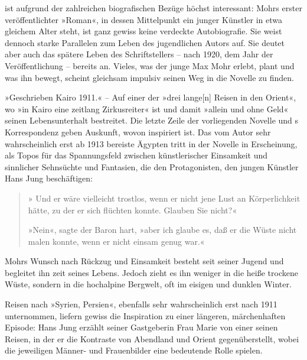 \begin{small}
\noindent{}\textit{\buchtitel{}} ist aufgrund
der zahlreichen biografischen Bezüge höchst interessant:
Mohrs erster veröffentlichter »Roman«, in dessen Mittelpunkt
ein junger Künstler in etwa gleichem Alter steht,
ist ganz gewiss keine verdeckte Autobiografie. Sie weist dennoch
starke Parallelen zum Leben des jugendlichen Autors auf. Sie deutet aber auch
das spätere Leben des Schriftstellers – nach 1920, dem Jahr der
Veröffentlichung – bereits an. Vieles, was der junge Max Mohr erlebt,
plant und was ihn bewegt, scheint gleichsam impulsiv seinen
Weg in die Novelle zu finden.

»Geschrieben Kairo 1911.« – Auf einer der »drei lange[n]
Reisen in den Orient«, wo \buchautor{} »in Kairo eine zeitlang
Zirkusreiter« ist und damit »allein und ohne Geld« seinen
Lebensunterhalt bestreitet. Die letzte Zeile der vorliegenden
Novelle und \buchautor{}s Korrespondenz%
geben Auskunft,
wovon \textit{\buchtitel{}} inspiriert ist. Das vom Autor
sehr wahrscheinlich erst ab 1913 bereiste Ägypten tritt in der Novelle
in Erscheinung,
als Topos für das Spannungsfeld
zwischen künstlerischer Einsamkeit und sinnlicher Sehnsüchte und
Fantasien, die den Protagonisten, den jungen Künstler
Hans Jung beschäftigen:

\begin{quote}
» Und er wäre vielleicht trostlos,
wenn er nicht jene Lust an Körperlichkeit hätte, zu
der er sich flüchten konnte. Glauben Sie nicht?«

»Nein«, sagte der Baron hart, »aber ich glaube es,
daß er die Wüste nicht malen konnte, wenn er nicht
einsam genug war.«
\end{quote}

Mohrs Wunsch nach Rückzug und Einsamkeit besteht seit seiner
Jugend und begleitet ihn zeit seines Lebens. Jedoch zieht es
ihn weniger in die heiße trockene Wüste, sondern in die hochalpine
Bergwelt, oft im eisigen und dunklen Winter.

Reisen nach »Syrien, Persien«,
ebenfalls sehr wahrscheinlich erst nach 1911 unternommen,
liefern gewiss die Inspiration zu einer längeren,
märchenhaften Episode:
Hans Jung erzählt seiner Gastgeberin
Frau Marie von einer seinen Reisen, in der er die Kontraste
von Abendland und Orient gegenüberstellt, wobei die jeweiligen
Männer- und Frauenbilder eine bedeutende Rolle spielen.


\end{small}
